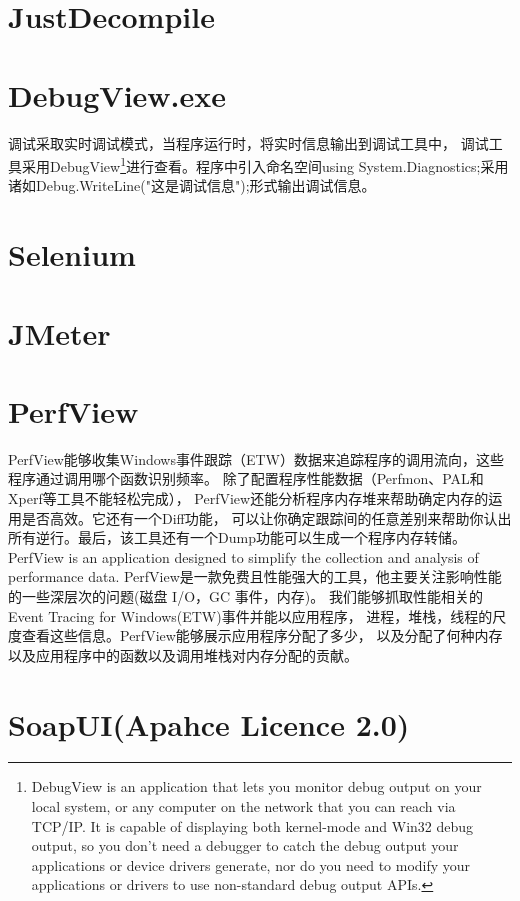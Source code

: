 \documentclass{book}
\begin{document}
\section{JustDecompile}

\section{DebugView.exe}

调试采取实时调试模式，当程序运行时，将实时信息输出到调试工具中，
调试工具采用DebugView\footnote{DebugView is an application that lets you monitor debug output on your local system, or any computer on the network that you can reach via TCP/IP. It is capable of displaying both kernel-mode and Win32 debug output, so you don't need a debugger to catch the debug output your applications or device drivers generate, nor do you need to modify your applications or drivers to use non-standard debug output APIs.}进行查看。程序中引入命名空间using System.Diagnostics;采用诸如Debug.WriteLine("这是调试信息");形式输出调试信息。

\section{Selenium}

\section{JMeter}

\section{PerfView}

PerfView能够收集Windows事件跟踪（ETW）数据来追踪程序的调用流向，这些程序通过调用哪个函数识别频率。
除了配置程序性能数据（Perfmon、PAL和Xperf等工具不能轻松完成），
PerfView还能分析程序内存堆来帮助确定内存的运用是否高效。它还有一个Diff功能，
可以让你确定跟踪间的任意差别来帮助你认出所有逆行。最后，该工具还有一个Dump功能可以生成一个程序内存转储。
PerfView is an application designed to simplify the collection and analysis of performance data.
PerfView是一款免费且性能强大的工具，他主要关注影响性能的一些深层次的问题(磁盘 I/O，GC 事件，内存)。
我们能够抓取性能相关的 Event Tracing for Windows(ETW)事件并能以应用程序，
进程，堆栈，线程的尺度查看这些信息。PerfView能够展示应用程序分配了多少，
以及分配了何种内存以及应用程序中的函数以及调用堆栈对内存分配的贡献。


\section{SoapUI(Apahce Licence 2.0)}
\end{document}
